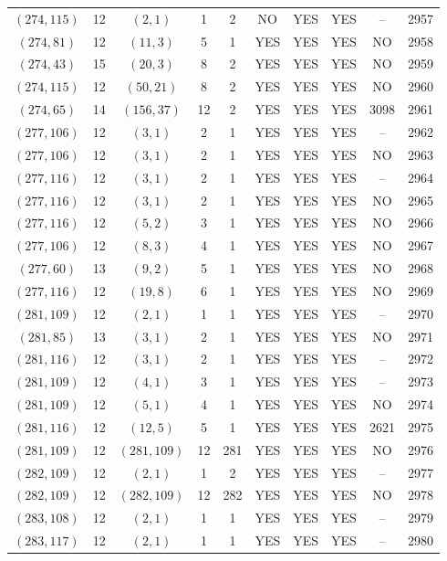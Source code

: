 \begin{longtable}{|c|c|c|c|c|c|c|c|c|c|}
$(274, 115)$ & 12 & $(2, 1)$ & 1 & 2 & NO & YES & YES & -- & 2957\\
$(274, 81)$ & 12 & $(11, 3)$ & 5 & 1 & YES & YES & YES & NO & 2958\\
$(274, 43)$ & 15 & $(20, 3)$ & 8 & 2 & YES & YES & YES & NO & 2959\\
$(274, 115)$ & 12 & $(50, 21)$ & 8 & 2 & YES & YES & YES & NO & 2960\\
$(274, 65)$ & 14 & $(156, 37)$ & 12 & 2 & YES & YES & YES & 3098 & 2961\\
$(277, 106)$ & 12 & $(3, 1)$ & 2 & 1 & YES & YES & YES & -- & 2962\\
$(277, 106)$ & 12 & $(3, 1)$ & 2 & 1 & YES & YES & YES & NO & 2963\\
$(277, 116)$ & 12 & $(3, 1)$ & 2 & 1 & YES & YES & YES & -- & 2964\\
$(277, 116)$ & 12 & $(3, 1)$ & 2 & 1 & YES & YES & YES & NO & 2965\\
$(277, 116)$ & 12 & $(5, 2)$ & 3 & 1 & YES & YES & YES & NO & 2966\\
$(277, 106)$ & 12 & $(8, 3)$ & 4 & 1 & YES & YES & YES & NO & 2967\\
$(277, 60)$ & 13 & $(9, 2)$ & 5 & 1 & YES & YES & YES & NO & 2968\\
$(277, 116)$ & 12 & $(19, 8)$ & 6 & 1 & YES & YES & YES & NO & 2969\\
$(281, 109)$ & 12 & $(2, 1)$ & 1 & 1 & YES & YES & YES & -- & 2970\\
$(281, 85)$ & 13 & $(3, 1)$ & 2 & 1 & YES & YES & YES & NO & 2971\\
$(281, 116)$ & 12 & $(3, 1)$ & 2 & 1 & YES & YES & YES & -- & 2972\\
$(281, 109)$ & 12 & $(4, 1)$ & 3 & 1 & YES & YES & YES & -- & 2973\\
$(281, 109)$ & 12 & $(5, 1)$ & 4 & 1 & YES & YES & YES & NO & 2974\\
$(281, 116)$ & 12 & $(12, 5)$ & 5 & 1 & YES & YES & YES & 2621 & 2975\\
$(281, 109)$ & 12 & $(281, 109)$ & 12 & 281 & YES & YES & YES & NO & 2976\\
$(282, 109)$ & 12 & $(2, 1)$ & 1 & 2 & YES & YES & YES & -- & 2977\\
$(282, 109)$ & 12 & $(282, 109)$ & 12 & 282 & YES & YES & YES & NO & 2978\\
$(283, 108)$ & 12 & $(2, 1)$ & 1 & 1 & YES & YES & YES & -- & 2979\\
$(283, 117)$ & 12 & $(2, 1)$ & 1 & 1 & YES & YES & YES & -- & 2980\\

\end{longtable}
